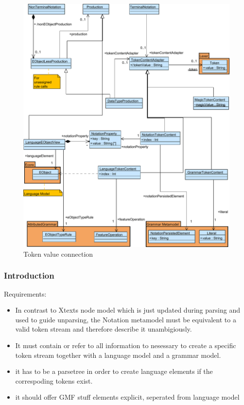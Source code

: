 \begin{figure}
\centering
\includegraphics[scale=0.7]{gfx/ex/Notation_DataLink} 
\caption{Token value connection}
\label{MM:Not:DataLink}
\end{figure}


\subsubsection{Introduction}
Requirements:
\begin{itemize}
	\item In contrast to Xtexts node model which is just updated during parsing and used to guide unparsing, the Notation metamodel must be equivalent to a valid token stream and therefore describe it unambigiously. 
	\item It must contain or refer to all information to nesessary to create a specific token stream together with a language model and a grammar model.   
	\item it has to be a parsetree in order to create language elements if the correspoding tokens exist.
	\item it should offer GMF stuff elements 
	explicit, seperated from language model
\end{itemize}


